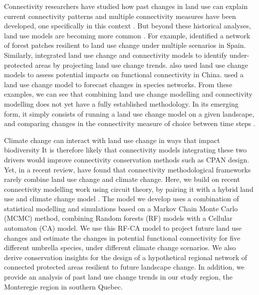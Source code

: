 Connectivity researchers have studied how past changes in land use can explain current connectivity patterns \citep{dupras_urban_2015, henareh_khalyani_spatial_2013, vergara_deforestation_2013, patru-stupariu_using_2013} and multiple connectivity measures have been developed, one specifically in this context \citep{saura_new_2007}. But beyond these historical analyses, land use models are becoming more common \citep{correa_ayram_habitat_2015}. For example, \cite{rubio_sustaining_2012} identified a network of forest patches resilient to land use change under multiple scenarios in Spain. Similarly, \cite{piquer-rodriguez_future_2012} integrated land use change and connectivity models to identify under-protected areas by projecting land use change trends. \cite{huang_simulating_2018} also used land use change models to assess potential impacts on functional connectivity in China. \cite{albert_applying_2017} used a land use change model to forecast changes in species networks. From these examples, we can see that combining land use change modelling and connectivity modelling does not yet have a fully established methodology. In its emerging form, it simply consists of running a land use change model on a given landscape, and comparing changes in the connectivity measure of choice between time steps \citep{perkl_urban_2018}.

Climate change can interact with land use change in ways that impact biodiversity \citep{oliver_interactions_2014} It is therefore likely that connectivity models integrating these two drivers would improve connectivity conservation methods such as CPAN design. Yet, in a recent review, \cite{costanza_landscape_2019} have found that connectivity methodological frameworks rarely combine  land use change and climate change. Here, we build on recent connectivity modelling work using circuit theory, by pairing it with a hybrid land use and climate change model \citep{albert_applying_2017}. The model we develop uses a combination of statistical modelling and simulations based on a Markov Chain Monte Carlo (MCMC) method, combining Random forests (RF) models with a Cellular automaton (CA) model. We use this RF-CA model to project future land use changes and estimate the changes in potential functional connectivity for five different umbrella species, under different climate change scenarios. We also derive conservation insights for the design of a hypothetical regional network of connected protected areas resilient to future landscape change. In addition, we provide an analysis of past land use change trends in our study region, the Monteregie region in southern Quebec.

